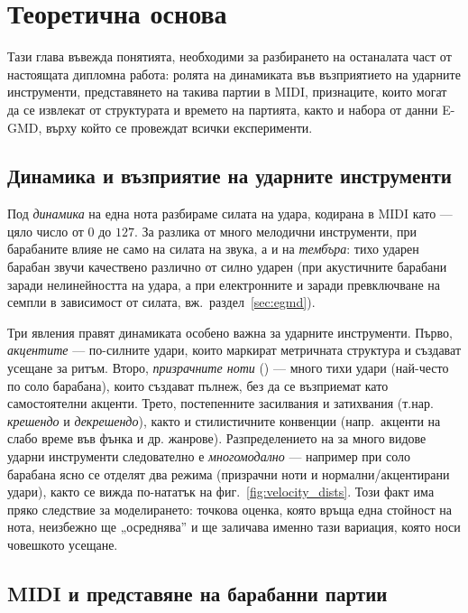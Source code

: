 \chapter{Теоретична основа}
\label{ch:osnova}

Тази глава въвежда понятията, необходими за разбирането на останалата част от
настоящата дипломна работа: ролята на динамиката във възприятието на ударните инструменти,
представянето на такива партии в MIDI, признаците, които могат да се извлекат
от структурата и времето на партията, както и набора от данни E-GMD, върху
който се провеждат всички експерименти.

\section{Динамика и възприятие на ударните инструменти}
\label{sec:dinamika}

Под \emph{динамика} на една нота разбираме силата на удара, кодирана в MIDI като
 — цяло число от $0$ до $127$. За разлика от много мелодични
инструменти, при барабаните  влияе не само на силата на звука, а и
на \emph{тембъра}: тихо ударен барабан звучи качествено различно от силно ударен
(при акустичните барабани заради нелинейността на удара, а при електронните и
заради превключване на семпли в зависимост от силата, вж.\ раздел~\ref{sec:egmd}).

Три явления правят динамиката особено важна за ударните инструменти. Първо, \emph{акцентите}
— по-силните удари, които маркират метричната структура и създават усещане за
ритъм. Второ, \emph{призрачните ноти} () — много тихи удари
(най-често по соло барабана), които създават пълнеж, без да се възприемат като
самостоятелни акценти. Трето, постепенните засилвания и затихвания (т.нар. \emph{крешендо}
и \emph{декрешендо}), както и стилистичните конвенции (напр.\ акценти на слабо време във 
фънка и др. жанрове). Разпределението на  за много видове ударни инструменти
следователно е \emph{многомодално} — например при соло барабана ясно се отделят два режима
(призрачни ноти и нормални/акцентирани удари), както се вижда по-нататък на
фиг.~\ref{fig:velocity_dists}. Този факт има пряко следствие за моделирането:
точкова оценка, която връща една стойност на нота, неизбежно ще „осреднява'' и
ще заличава именно тази вариация, която носи човешкото усещане.

\section{MIDI и представяне на барабанни партии}
\label{sec:midi}

